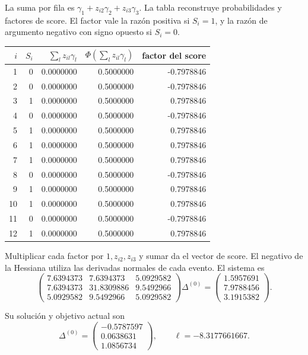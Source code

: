 \documentclass[11pt,a4paper]{article}
\begin{document}
La suma por fila es
\(\gamma_1+z_{i2}\gamma_2+z_{i3}\gamma_3\).
La tabla reconstruye probabilidades
y factores de score.
El factor vale la razón
positiva si \(S_i=1\),
y la razón de argumento
negativo con signo opuesto
si \(S_i=0\).
\begin{center}\small\begin{tabular}{rrrrr}\toprule
\(i\)&\(S_i\)&\(\sum_lz_{il}\gamma_l\)&\(\Phi(\sum_lz_{il}\gamma_l)\)&factor del score\\\midrule
1&0&0.0000000&0.5000000&-0.7978846\\
2&0&0.0000000&0.5000000&-0.7978846\\
3&1&0.0000000&0.5000000&0.7978846\\
4&0&0.0000000&0.5000000&-0.7978846\\
5&1&0.0000000&0.5000000&0.7978846\\
6&1&0.0000000&0.5000000&0.7978846\\
7&1&0.0000000&0.5000000&0.7978846\\
8&0&0.0000000&0.5000000&-0.7978846\\
9&1&0.0000000&0.5000000&0.7978846\\
10&1&0.0000000&0.5000000&0.7978846\\
11&0&0.0000000&0.5000000&-0.7978846\\
12&1&0.0000000&0.5000000&0.7978846\\\bottomrule\end{tabular}\end{center}
Multiplicar cada factor por
\(1,z_{i2},z_{i3}\)
y sumar da el vector
de score.
El negativo de la Hessiana
utiliza las derivadas
normales de cada evento.
El sistema es
\[
\begin{pmatrix}7.6394373&7.6394373&5.0929582\\7.6394373&31.8309886&9.5492966\\5.0929582&9.5492966&5.0929582\end{pmatrix}\Delta^{(0)}=\begin{pmatrix}1.5957691\\7.9788456\\3.1915382\end{pmatrix}.
\]

Su solución y objetivo actual son
\[
\Delta^{(0)}=\begin{pmatrix}-0.5787597\\0.0638631\\1.0856734\end{pmatrix},\qquad\ell=-8.3177661667.
\]
\end{document}

